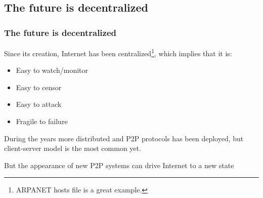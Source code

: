 \documentclass[notitlepage, usenames,dvipsnames]{beamer}
\newcommand{\st}{\structure}
\begin{document}
    \subsection{The future is decentralized}
    \begin{frame}
        \frametitle{The future is decentralized}

         {
            Since its creation, Internet has been \st{mostly} centralized\footnote{ARPANET hosts file is a great example.},
            which implies that it is:

            \vspace{-1ex}
            \begin{itemize}
                \item Easy to \alert{watch/monitor}
                \item Easy to \alert{censor}
                \item Easy to \alert{attack}
                \item \alert{Fragile} to failure
            \end{itemize}

            During the years more distributed and P2P protocols has been deployed, but client-server model is the most common yet.
        }

        \vspace{1ex}
         {
            \begin{exampleblock}{}
                But the appearance of new P2P systems can drive Internet to a new state
            \end{exampleblock}
        }

    \end{frame}
\end{document}
